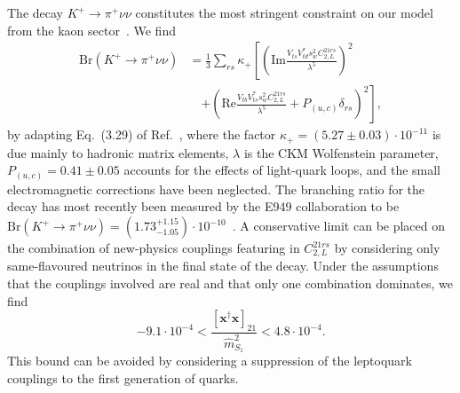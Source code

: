 The decay $K^+ \rightarrow \pi^+ \nu \nu$ constitutes the most stringent
constraint on our model from the kaon sector~\cite{Kumar:2016omp}. We
find
\begin{equation}
  \begin{split}
  \text{Br}(K^+\rightarrow \pi^+ \nu \nu) &= \frac{1}{3}\sum_{rs} \kappa_+ \left[ \left(\text{Im} \frac{ V_{ts}V_{td}^* s_w^2 C_{2,L}^{21rs} }{\lambda^5} \right)^2  \right. \\ &\quad \left. +  \left( \text{Re} \frac{ V_{tb}V_{ts}^* s_w^2 C_{2,L}^{21rs}}{\lambda^5} + P_{(u,c)} \delta_{rs} \right)^2 \right],
  \end{split}
\end{equation}
by adapting Eq.~(3.29) of Ref.~\cite{Altmannshofer:2009ma}, where the
factor $\kappa_+ = (5.27 \pm 0.03) \cdot 10^{-11}$ is due mainly to hadronic
matrix elements, $\lambda$ is the CKM Wolfenstein parameter, $P_{(u,c)} = 0.41
\pm 0.05$ accounts for the effects of light-quark loops, and the small
electromagnetic corrections have been neglected. The branching ratio for the
decay has most recently been measured by the E949 collaboration to be
$\text{Br}(K^+ \rightarrow \pi^+ \nu \nu) = (1.73^{+1.15}_{-1.05}) \cdot
10^{-10}$~\cite{Artamonov:2009sz}. A conservative limit can be placed on the
combination of new-physics couplings featuring in $C_{2,L}^{21rs}$ by
considering only same-flavoured neutrinos in the final state of the decay. Under
the assumptions that the couplings involved are real and that only one
combination dominates, we find
\begin{equation} \label{eq:ch3-kpinunubound}
  -9.1 \cdot 10^{-4} < \frac{[\mathbf{x}^\dagger \mathbf{x}]_{21}}{\hat{m}_{S_{1}}^2} < 4.8 \cdot 10^{-4}.
\end{equation}
This bound can be avoided by considering a suppression of the leptoquark
couplings to the first generation of quarks.

